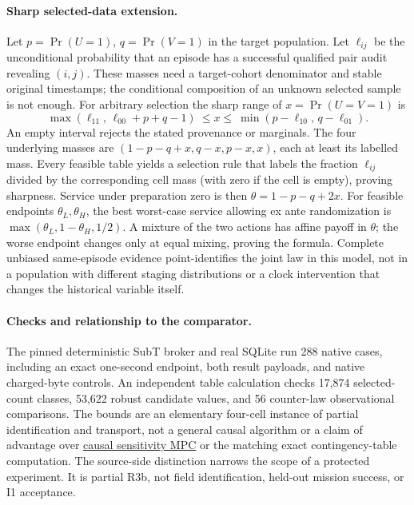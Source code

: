 \documentclass{article}
\begin{document}
\paragraph{Sharp selected-data extension.}
Let \(p=\Pr(U=1)\), \(q=\Pr(V=1)\) in the target population.
Let \(\ell_{ij}\) be the unconditional probability that an episode has
a successful qualified pair audit revealing \((i,j)\). These masses
need a target-cohort denominator and stable original timestamps;
the conditional composition of an unknown selected sample is not
enough. For arbitrary selection the sharp range of \(x=\Pr(U=V=1)\)
is
\[
  \max(\ell_{11},\,\ell_{00}+p+q-1)
  \ \le x\le\
  \min(p-\ell_{10},\,q-\ell_{01}).
\]
An empty interval rejects the stated provenance or marginals.
The four underlying masses are
\((1-p-q+x,q-x,p-x,x)\), each at least its labelled mass.
Every feasible table yields a selection rule that labels the
fraction \(\ell_{ij}\) divided by the corresponding cell mass
(with zero if the cell is empty), proving sharpness.
Service under preparation zero is then
\(\theta=1-p-q+2x\). For feasible endpoints \(\theta_L,\theta_H\),
the best worst-case service allowing ex ante randomization is
\(\max(\theta_L,1-\theta_H,1/2)\).
A mixture of the two actions has affine payoff in \(\theta\);
the worse endpoint changes only at equal mixing, proving the formula.
Complete unbiased same-episode evidence point-identifies the joint
law in this model, not in a population with different staging
distributions or a clock intervention that changes the historical
variable itself.

\paragraph{Checks and relationship to the comparator.}
The pinned deterministic SubT broker and real SQLite run 288 native
cases, including an exact one-second endpoint, both result
payloads, and native charged-byte controls. An independent table
calculation checks 17,874 selected-count classes, 53,622 robust
candidate values, and 56 counter-law observational comparisons.
The bounds are an elementary four-cell instance of partial
identification and transport, not a general causal algorithm or
a claim of advantage over
\href{https://proceedings.mlr.press/v286/marmarelis25a.html}{causal sensitivity MPC}
or the matching exact contingency-table computation.
The source-side distinction narrows the scope of a protected
experiment. It is partial R3b, not field identification, held-out
mission success, or I1 acceptance.
\end{document}
